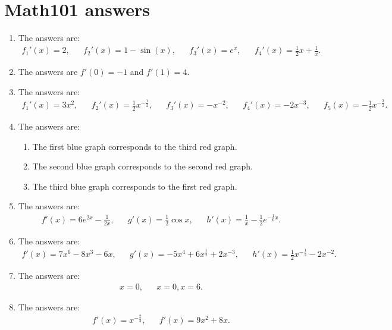 \newpage
\section{Math101 answers}
\begin{enumerate}
	\item The answers are:
	\begin{align*}
	f_1'(x)=2,&& f_2'(x)=1-\sin(x),&& f_3'(x)=e^x,&&f_4'(x)=\frac{1}{2}x+\frac{1}{x}.
	\end{align*}
	
	
	\item The answers are $f'(0)=-1$ and $f'(1)=4$.

	\item The answers are:
	\begin{align*}
	f_1'(x)=3x^2,&& f_2'(x)=\frac{1}{2}x^{-\frac{1}{2}},&& f_3'(x)=-x^{-2},&&f_4'(x)=-2x^{-3},&&f_5(x)=-\frac{1}{2}x^{-\frac{3}{2}}.
	\end{align*}
	\item  The answers are:
\begin{enumerate}
	\item The first blue graph corresponds to the third red graph.
	\item The second blue graph corresponds to the second red graph.
	\item The third blue graph corresponds to the first red graph.
	\end{enumerate}
	
	\item The answers are:
	\begin{align*}
	f'(x)=6e^{2x}-\frac{1}{2x},&& g'(x)=\frac{1}{2}\cos x,&& h'(x)=\frac{1}{x}-\frac{1}{2}e^{-\frac{1}{6}x}.
	\end{align*}
	
	\item The answers are:
	\begin{align*}
	f'(x)=7x^6-8x^3-6x,&&g'(x)=-5x^4+6x^{\frac{1}{2}}+2x^{-3},&&h'(x)=\frac{1}{2}x^{-\frac{1}{2}}-2x^{-2}.
	\end{align*}
	
	
	\item The answers are:
	\begin{align*}
	x=0,&& x=0,x=6. 
	\end{align*}
	
	\item The answers are:
	\begin{align*}
	f'(x)=x^{-\frac{2}{3}},&& f'(x)=9x^2+8x.
	\end{align*}
		


\end{enumerate}
